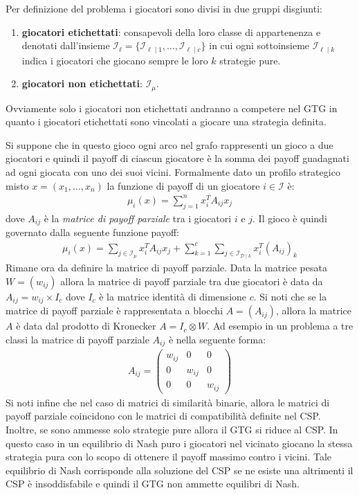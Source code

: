 	Per definizione del problema i giocatori sono divisi in due gruppi disgiunti:
	\begin{enumerate}
		\item \textbf{giocatori etichettati}: consapevoli della loro classe di appartenenza e denotati dall'insieme $\mathcal{I}_\ell = \{\mathcal{I}_{\ell \mid 1}, \dots, \mathcal{I}_{\ell \mid c}\}$ in cui ogni sottoinsieme $\mathcal{I}_{\ell \mid k}$ indica i giocatori che giocano sempre le loro $k$ strategie pure.
		\item \textbf{giocatori non etichettati}: $\mathcal{I}_\mu$.
	\end{enumerate}
	Ovviamente solo i giocatori non etichettati andranno a competere nel GTG in quanto i giocatori etichettati sono vincolati a giocare una strategia definita.
	
	\newpage
	
	Si suppone che in questo gioco ogni arco nel grafo rappresenti un gioco a due giocatori e quindi il payoff di ciascun giocatore è la somma dei payoff guadagnati ad ogni giocata con uno dei suoi vicini. Formalmente dato un profilo strategico misto $x = (x_1, \dots, x_n)$ la funzione di payoff di un giocatore $i \in \mathcal{I}$ è:
	\begin{align*}
		\mu_i(x) = \sum_{j=1}^n x_i^T A_{ij} x_j
	\end{align*}
	dove $A_{ij}$ è la \emph{matrice di payoff parziale} tra i giocatori $i$ e $j$. Il gioco è quindi governato dalla seguente funzione payoff:
	\begin{align*}
		\mu_i(x) = \sum_{j \in \mathcal{I}_\mu} x_i^T A_{ij} x_j + \sum_{k=1}^c \sum_{j \in \mathcal{I}_{\mathcal{D} \mid k}} x_i^T (A_{ij})_k
	\end{align*}
	Rimane ora da definire la matrice di payoff parziale. Data la matrice pesata $W = (w_{ij})$ allora la matrice di payoff parziale tra due giocatori è data da $A_{ij} = w_{ij} \times I_c$ dove $I_c$ è la matrice identità di dimensione $c$. Si noti che se la matrice di payoff parziale è rappresentata a blocchi $A = (A_{ij})$, allora la matrice $A$ è data dal prodotto di Kronecker $A = I_c \otimes W$. Ad esempio in un problema a tre classi la matrice di payoff parziale $A_{ij}$ è nella seguente forma:
	\begin{align*}
		A_{ij} =
		\begin{pmatrix}
			w_{ij} & 0 & 0 \\
			0 & w_{ij} & 0 \\
			0 & 0 & w_{ij} 
		\end{pmatrix}
	\end{align*}
	Si noti infine che nel caso di matrici di similarità binarie, allora le matrici di payoff parziale coincidono con le matrici di compatibilità definite nel CSP. Inoltre, se sono ammesse solo strategie pure allora il GTG si riduce al CSP. In questo caso in un equilibrio di Nash puro i giocatori nel vicinato giocano la stessa strategia pura con lo scopo di ottenere il payoff massimo contro i vicini. Tale equilibrio di Nash corrisponde alla soluzione del CSP se ne esiste una altrimenti il CSP è insoddisfabile e quindi il GTG non ammette equilibri di Nash.
	
